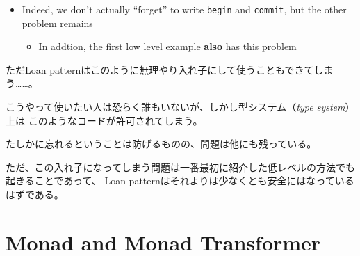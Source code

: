 \begin{frame}[fragile]
\begin{itemize}
    \item<+-> Indeed, we don't actually ``forget'' to write \lstinline|begin| and \lstinline|commit|,
    but the other problem remains
    \begin{itemize}
      \item In addtion, the first low level example \textbf{also} has this problem
    \end{itemize}
  \end{itemize}

  \begin{notes}
    \item ただLoan patternはこのように無理やり入れ子にして使うこともできてしまう……。

    \item こうやって使いたい人は恐らく誰もいないが、しかし型システム（\emph{type system}）上は
    このようなコードが許可されてしまう。

    \item たしかに忘れるということは防げるものの、問題は他にも残っている。

    \item ただ、この入れ子になってしまう問題は一番最初に紹介した低レベルの方法でも起きることであって、
    Loan patternはそれよりは少なくとも安全にはなっているはずである。
  \end{notes}
\end{frame}

\section{Monad and Monad Transformer}

